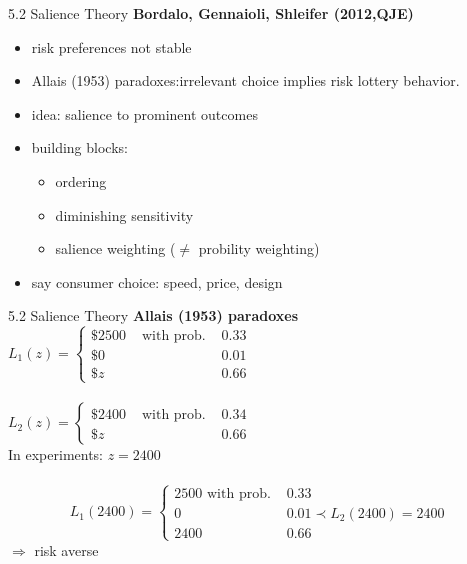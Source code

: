 \documentclass[11pt,aspectratio=169]{beamer}
\begin{document}
\begin{frame}{5.2 Salience Theory}
    \textbf{Bordalo, Gennaioli, Shleifer (2012,QJE)}   
    \begin{itemize}
        \item risk preferences not stable\medskip
        \item Allais (1953) paradoxes:irrelevant choice implies risk lottery behavior.\medskip
        \item idea: salience to prominent outcomes\medskip
        \item building blocks:
        \begin{itemize}
            \item ordering\medskip
            \item diminishing sensitivity\medskip
            \item salience weighting ($\neq$ probility weighting)
        \end{itemize}
        \item say consumer choice: speed, price, design\medskip
	\end{itemize} 
\end{frame}

\begin{frame}{5.2 Salience Theory}
\textbf{Allais (1953) paradoxes}\\
$L_1(z)=\left\{\begin{array}{lll}\$ 2500 & \text { with prob. } & 0.33\\ \$0 & & 0.01 \\ \$ z & & 0.66\end{array}\right.$\\
\hspace*{\fill} \\ 
$L_2(z)=\left\{\begin{array}{lll}\$ 2400 & \text { with prob. } & 0.34 \\ \$ z & & 0.66\end{array}\right.$\\
In experiments: $z=2400$ \\
\hspace*{\fill} \\ 
$$
L_1(2400)= \begin{cases} 2500 \text { with prob. } & 0.33 \\  0 & 0.01 \prec  L_2(2400)=2400\\  2400 & 0.66\end{cases}
$$
$\Rightarrow$ risk averse
\end{frame}
\end{document}
